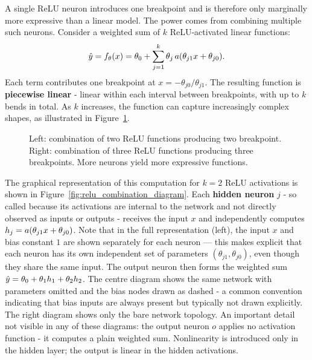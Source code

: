 A single ReLU neuron introduces one breakpoint and is therefore only marginally more expressive than a linear model. The power comes from combining multiple such neurons. Consider a weighted sum of $k$ ReLU-activated linear functions:
\begin{equation}
 \hat{y} = f_\theta(x) = \theta_0 + \sum_{j=1}^{k} \theta_j \, a(\theta_{j1} x + \theta_{j0}).
\end{equation}
Each term contributes one breakpoint at $x = -\theta_{j0} / \theta_{j1}$. The resulting function is \textbf{piecewise linear} - linear within each interval between breakpoints, with up to $k$ bends in total. As $k$ increases, the function can capture increasingly complex shapes, as illustrated in Figure~\ref{fig:relu_combination}.

\begin{figure}[h]
 \centering
 \begin{minipage}{0.48\textwidth}
 \centering
 \resizebox{\textwidth}{!}{}
 \end{minipage}
 \hfill
 \begin{minipage}{0.48\textwidth}
 \centering
 \resizebox{\textwidth}{!}{}
 \end{minipage}
 \caption{Left: combination of two ReLU functions producing two breakpoint. Right: combination of three ReLU functions producing three breakpoints. More neurons yield more expressive functions.}
 \label{fig:relu_combination}
\end{figure}

The graphical representation of this computation for $k = 2$ ReLU activations is shown in Figure~\ref{fig:relu_combination_diagram}. 
Each \textbf{hidden neuron} $j$ - so called because its activations are internal to the network and not directly observed as inputs or outputs - receives the input $x$ and independently computes $h_j = a(\theta_{j1} x + \theta_{j0})$. 
Note that in the full representation (left), the input $x$ and bias constant $1$ are shown separately for each neuron --- this makes explicit that each neuron has its own independent set of parameters $(\theta_{j1}, \theta_{j0})$, even though they share the same input. The output neuron then forms the weighted sum $\hat{y} = \theta_0 + \theta_1 h_1 + \theta_2 h_2$. The centre diagram shows the same network with parameters omitted and the bias nodes drawn as dashed - a common convention indicating that bias inputs are always present but typically not drawn explicitly. The right diagram shows only the bare network topology. An important detail not visible in any of these diagrams: the output neuron $o$ applies no activation function - it computes a plain weighted sum. Nonlinearity is introduced only in the hidden layer; the output is linear in the hidden activations.

